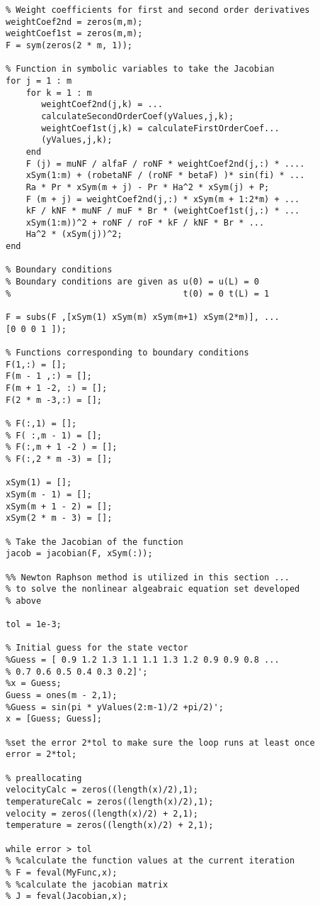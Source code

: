 \begin{lstlisting}
% Weight coefficients for first and second order derivatives
weightCoef2nd = zeros(m,m);
weightCoef1st = zeros(m,m);
F = sym(zeros(2 * m, 1));

% Function in symbolic variables to take the Jacobian
for j = 1 : m
    for k = 1 : m
       weightCoef2nd(j,k) = ...
       calculateSecondOrderCoef(yValues,j,k);
       weightCoef1st(j,k) = calculateFirstOrderCoef...
       (yValues,j,k);
    end 
    F (j) = muNF / alfaF / roNF * weightCoef2nd(j,:) * ....
    xSym(1:m) + (robetaNF / (roNF * betaF) )* sin(fi) * ...
    Ra * Pr * xSym(m + j) - Pr * Ha^2 * xSym(j) + P;
    F (m + j) = weightCoef2nd(j,:) * xSym(m + 1:2*m) + ...
    kF / kNF * muNF / muF * Br * (weightCoef1st(j,:) * ...
    xSym(1:m))^2 + roNF / roF * kF / kNF * Br * ...
    Ha^2 * (xSym(j))^2;
end

% Boundary conditions
% Boundary conditions are given as u(0) = u(L) = 0
%                                  t(0) = 0 t(L) = 1

F = subs(F ,[xSym(1) xSym(m) xSym(m+1) xSym(2*m)], ...
[0 0 0 1 ]);

% Functions corresponding to boundary conditions
F(1,:) = [];
F(m - 1 ,:) = [];
F(m + 1 -2, :) = [];
F(2 * m -3,:) = [];

% F(:,1) = [];
% F( :,m - 1) = [];
% F(:,m + 1 -2 ) = [];
% F(:,2 * m -3) = [];

xSym(1) = [];
xSym(m - 1) = [];
xSym(m + 1 - 2) = [];
xSym(2 * m - 3) = [];

% Take the Jacobian of the function
jacob = jacobian(F, xSym(:));

%% Newton Raphson method is utilized in this section ...
% to solve the nonlinear algeabraic equation set developed 
% above

tol = 1e-3;

% Initial guess for the state vector
%Guess = [ 0.9 1.2 1.3 1.1 1.1 1.3 1.2 0.9 0.9 0.8 ... 
% 0.7 0.6 0.5 0.4 0.3 0.2]';
%x = Guess;
Guess = ones(m - 2,1);
%Guess = sin(pi * yValues(2:m-1)/2 +pi/2)';
x = [Guess; Guess];

%set the error 2*tol to make sure the loop runs at least once 
error = 2*tol;

% preallocating
velocityCalc = zeros((length(x)/2),1);
temperatureCalc = zeros((length(x)/2),1);
velocity = zeros((length(x)/2) + 2,1);
temperature = zeros((length(x)/2) + 2,1);

while error > tol
% %calculate the function values at the current iteration
% F = feval(MyFunc,x);
% %calculate the jacobian matrix
% J = feval(Jacobian,x);


\end{lstlisting}
